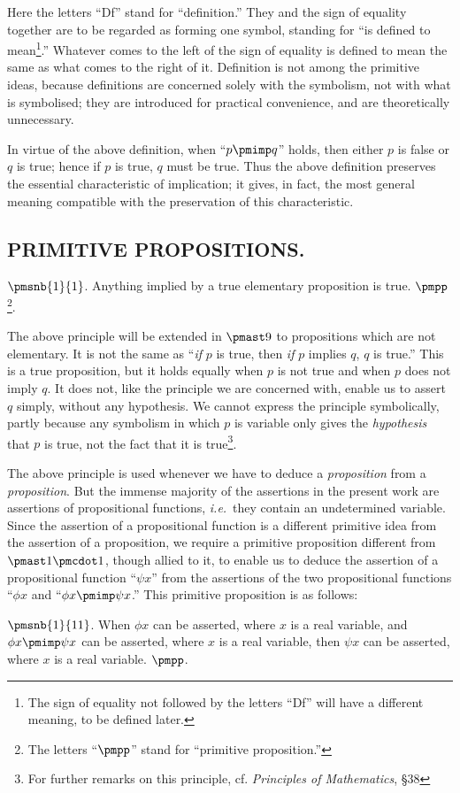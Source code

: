 Here the letters ``Df'' stand for ``definition.'' They and the sign of equality together are to be regarded as forming one symbol, standing for ``is defined to mean\footnote{The sign of equality not followed by the letters ``Df'' will have a different meaning, to be defined later.}.'' Whatever comes to the left of the sign of equality is defined to mean the same as what comes to the right of it. Definition is not among the primitive ideas, because definitions are concerned solely with the symbolism, not with what is symbolised; they are introduced for practical convenience, and are theoretically unnecessary.

In virtue of the above definition, when ``$p \pmimp q$'' holds, then either $p$ is false or $q$ is true; hence if $p$ is true, $q$ must be true. Thus the above definition preserves the essential characteristic of implication; it gives, in fact, the most general meaning compatible with the preservation of this characteristic.

\subsection*{\centering PRIMITIVE PROPOSITIONS.}
\begin{flushleft}
	\(\pmsnb{1}{1}\). Anything implied by a true elementary proposition is true. $\pmpp$\footnote{The letters ``$\pmpp$'' stand for ``primitive proposition.''}.
\end{flushleft}

 The above principle will be extended in $\pmast9$ to propositions which are not elementary. It is not the same as ``\textit{if} $p$ is true, then \textit{if} $p$ implies $q$, $q$ is  true.'' This is a true proposition, but it holds equally when $p$ is not true and when $p$ does not imply $q$. It does not, like the principle we are concerned with, enable us to assert $q$ simply, without any hypothesis. We cannot express the principle symbolically, partly because any symbolism in which $p$ is variable only gives the \textit{hypothesis} that $p$ is true, not the fact that it is true\footnote{For further remarks on this principle, cf. \textit{Principles of Mathematics}, \S38}.

The above principle is used whenever we have to deduce a \textit{proposition} from a \textit{proposition}. But the immense majority of the assertions in the present work are assertions of propositional functions, \textit{i.e.}\ they contain an undetermined variable. Since the assertion of a propositional function is a different primitive idea from the assertion of a proposition, we require a primitive proposition different from $\pmast1\pmcdot1$, though allied to it, to enable us to deduce the assertion of a propositional function ``$\psi x$'' from the assertions of the two propositional functions ``$\phi x$ and ``$\phi x \pmimp \psi x$.'' This primitive proposition is as follows:
\begin{flushleft}
	\(\pmsnb{1}{11}\). When $\phi x$ can be asserted, where $x$ is a real variable, and $\phi x \pmimp \psi x$ can be asserted, where $x$ is a real variable, then $\psi x$ can be asserted, where $x$ is a real variable. $\pmpp$.
\end{flushleft}

